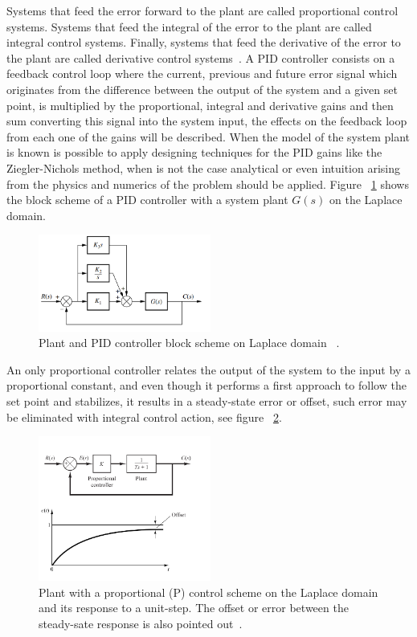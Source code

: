 Systems that feed the error forward to the plant are called proportional control systems. Systems that feed the integral of the error to the plant are called integral control systems. Finally, systems that feed the derivative of the error to the plant are called derivative control systems~\cite[Chapter ~9]{Nise}. A PID controller consists on a feedback control loop where the current, previous and future error signal which originates from the difference between the output of the system and a given set point, is multiplied by the proportional, integral and derivative gains  and then sum converting this signal into the system input, the effects on the feedback loop from each one of the gains will be described. When the model of the system plant is known is possible to apply designing techniques for the PID gains like the Ziegler-Nichols method, when is not the case analytical or even intuition arising from the physics and numerics of the problem should be applied. Figure ~\ref{PID_scheme} shows the block scheme of a PID controller with a system plant $G(s)$ on the Laplace domain.

\begin{figure}[h]
	\centering
	\includegraphics[width=0.505\textwidth]{Chp2/PID_scheme.png}
	\caption{ Plant and PID controller block scheme on Laplace domain ~\cite[Chapter~ 9]{Nise}. \label{PID_scheme}}
\end{figure}

 An only  proportional controller   relates the output of the system to the input by a proportional constant, and even though it performs a first approach to follow the  set point and stabilizes,  it results in a steady-state error or offset, such error may be eliminated with integral control action, see figure ~\ref{propGain}.
\smallskip

\begin{figure}[h]
	\centering
		\includegraphics[width=0.505\textwidth]{Chp2/propgain.png}
	\caption{ Plant with a proportional (P) control  scheme on the Laplace domain and its response to a unit-step. The offset or error between the steady-sate response is also pointed out~\cite[Chapter~ 5]{Ogata2009}. \label{propGain}}
\end{figure}


